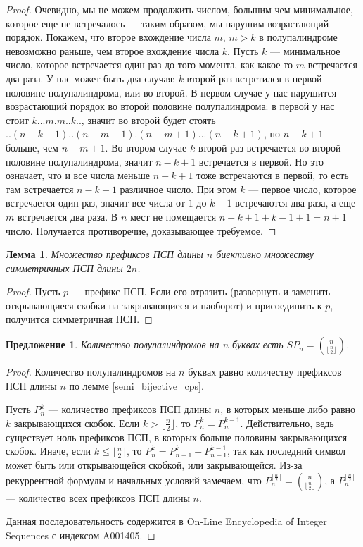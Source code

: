 \documentclass[a4paper,fleqn,12pt,top=0pt]{article}
\theoremstyle{plain}
\newtheorem{lemma}[theorem]{Лемма}
\newtheorem{proposition}[theorem]{Предложение}
\theoremstyle{definition}
\theoremstyle{remark}
\begin{document}
\begin{proof}
    Очевидно, мы не можем продолжить числом, большим чем минимальное, которое еще не встречалось --- таким образом, мы нарушим возрастающий порядок. Покажем, что второе вхождение числа $m$, $m>k$ в полупалиндроме невозможно раньше, чем второе вхождение числа $k$. Пусть $k$ --- минимальное число, которое встречается один раз до того момента, как какое-то $m$ встречается два раза. У нас может быть два случая: $k$ второй раз встретился в первой половине полупалиндрома, или во второй. В первом случае у нас нарушится возрастающий порядок во второй половине полупалиндрома: в первой у нас стоит $k...m.m..k..$, значит во второй будет стоять $..(n-k+1)..(n-m+1).(n-m+1)...(n-k+1)$, но $n - k + 1$ больше, чем $n - m + 1$. Во втором случае $k$ второй раз встречается во второй половине полупалиндрома, значит $n - k + 1$ встречается в первой. Но это означает, что и все числа меньше $n - k + 1$ тоже встречаются в первой, то есть там встречается $n - k + 1$ различное число. При этом $k$ --- первое число, которое встречается один раз, значит все числа от $1$ до $k-1$ встречаются два раза, а еще $m$ встречается два раза. В $n$ мест не помещается $n - k + 1 + k - 1 + 1 = n + 1$ число. Получается противоречие, доказывающее требуемое.
\end{proof}

\begin{lemma}
    Множество префиксов ПСП длины $n$ биективно множеству симметричных ПСП длины $2n$.
\end{lemma}
\begin{proof}
    Пусть $p$ --- префикс ПСП. Если его отразить (развернуть и заменить открывающиеся скобки на закрывающиеся и наоборот) и присоединить к $p$, получится симметричная ПСП. 
\end{proof}

\begin{proposition}
    Количество полупалиндромов на $n$ буквах есть $SP_n = \binom{n}{\lfloor \frac{n}{2} \rfloor}$.
\end{proposition}
\begin{proof}
    Количество полупалиндромов на $n$ буквах равно количеству префиксов ПСП длины $n$ по лемме \ref{semi_bijective_cps}.

    Пусть $P_n^k$ --- количество префиксов ПСП длины $n$, в которых меньше либо равно $k$ закрывающихся скобок. Если $k > \lfloor \frac{n}{2} \rfloor$, то $P_n^k = P_n^{k-1}$. Действительно, ведь существует ноль префиксов ПСП, в которых больше половины закрывающихся скобок. Иначе, если $k \le \lfloor \frac{n}{2} \rfloor$, то $P_n^k = P_{n-1}^k + P_{n-1}^{k-1}$, так как последний символ может быть или открывающейся скобкой, или закрывающейся. Из-за рекуррентной формулы и начальных условий замечаем, что $P_n^{\lfloor \frac{n}{2} \rfloor} = \binom{n}{\lfloor \frac{n}{2} \rfloor}$, а $P_n^{\lfloor \frac{n}{2} \rfloor}$ --- количество всех префиксов ПСП длины $n$.
    
    Данная последовательность содержится в On-Line Encyclopedia of Integer Sequences\cite{oeis} с индексом A001405.
\end{proof}
\end{document}
